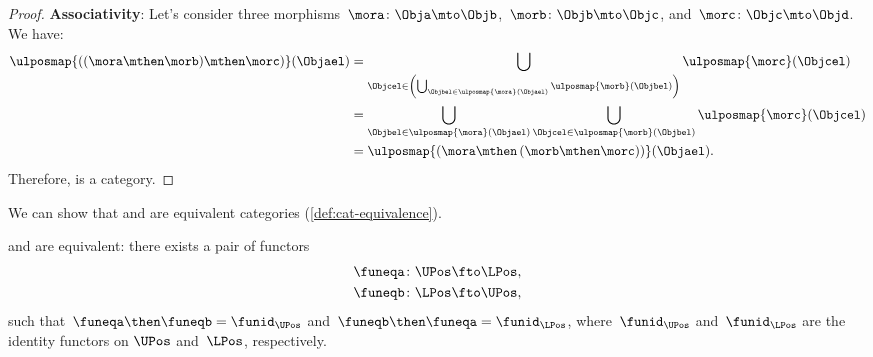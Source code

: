 \begin{proof}
    \textbf{Associativity}:
    Let's consider three morphisms~$\mora\colon \Obja \mto \Objb$,~$\morb\colon \Objb\mto \Objc$, and~$\morc\colon \Objc\mto \Objd$.
    We have:
    \begin{equation*}
        \begin{aligned}
            \ulposmap{\left( (\mora \mthen \morb) \mthen \morc\right)}(\Objael) & =
            \bigcup_{\Objcel \in \left( \bigcup_{\Objbel \in \ulposmap{\mora}(\Objael)}\ulposmap{\morb}(\Objbel)\right)}\ulposmap{\morc}(\Objcel)                                                        \\
                                                                                & =\bigcup_{\Objbel\in \ulposmap{\mora}(\Objael)}\bigcup_{\Objcel\in \ulposmap{\morb}(\Objbel)}\ulposmap{\morc}(\Objcel) \\
                                                                                & =\ulposmap{\left( \mora \mthen \left( \morb\mthen \morc\right)\right)}(\Objael).
        \end{aligned}
    \end{equation*}
    Therefore, \UPos is a category.
\end{proof}

We can show that \UPos and \LPos are equivalent categories (\cref{def:cat-equivalence}).

\begin{lemma}
    \label{lem:ulposequiv}
    \UPos and \LPos are equivalent: there exists a pair of functors
    \begin{equation}
        \begin{aligned}
            \funeqa\colon \UPos & \fto \LPos, \\
            \funeqb\colon \LPos & \fto \UPos,
        \end{aligned}
    \end{equation}
    such that~$\funeqa \then \funeqb=\funid_{\UPos}$ and~$\funeqb \then \funeqa=\funid_{\LPos}$, where~$\funid_{\UPos}$ and~$\funid_{\LPos}$ are the identity functors on $\UPos$ and~$\LPos$, respectively.
\end{lemma}

